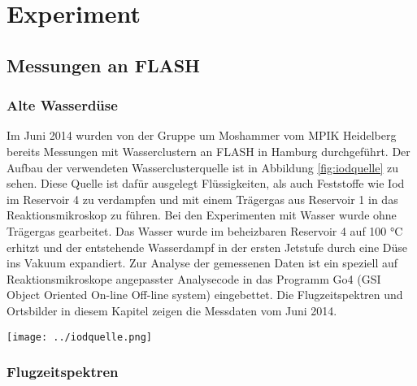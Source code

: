 \chapter{Experiment} 
\section{Messungen an FLASH}
\subsection{Alte Wasserdüse}

Im Juni 2014 wurden von der Gruppe um Moshammer vom MPIK Heidelberg bereits Messungen mit Wasserclustern an FLASH in Hamburg durchgeführt. Der Aufbau der verwendeten Wasserclusterquelle ist in Abbildung \ref{fig:iodquelle} zu sehen. Diese Quelle ist dafür ausgelegt Flüssigkeiten, als auch Feststoffe wie Iod im Reservoir 4 zu verdampfen und mit einem Trägergas aus Reservoir 1 in das Reaktionsmikroskop zu führen. Bei den Experimenten mit Wasser wurde ohne Trägergas gearbeitet. Das Wasser wurde im beheizbaren Reservoir 4 auf 100 °C erhitzt und der entstehende Wasserdampf in der ersten Jetstufe durch eine Düse ins Vakuum expandiert.
Zur Analyse der gemessenen Daten ist ein speziell auf Reaktionsmikroskope angepasster Analysecode in das Programm Go4 (GSI Object Oriented On-line Off-line system) eingebettet. Die Flugzeitspektren und Ortsbilder in diesem Kapitel zeigen die Messdaten vom Juni 2014. 

\begin{center}
\begin{minipage}{\linewidth}
\centering
\texttt{[image: ../iodquelle.png]}%
 \label{fig:iodquelle}
\end{minipage} 
\end{center} 

\subsection{Flugzeitspektren}


